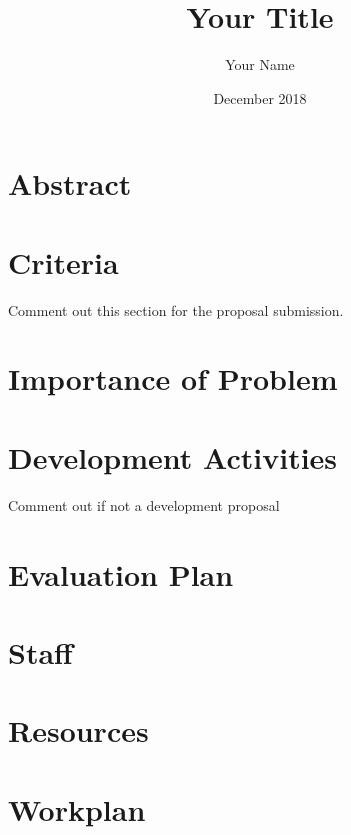 \documentclass[12pt,letterpaper]{article}
\title{Your Title}
\author{Your Name}
\date{December 2018}
\begin{document}
\maketitle
\thispagestyle{empty}

\tableofcontents
\clearpage
\section*{Abstract}
{

\normalsize

}

\clearpage
{} 

%
\section{Criteria}
Comment out this section for the proposal submission.

\section{Importance of Problem}

\section{Development Activities}
Comment out if not a development proposal

%
\section{Evaluation Plan}

\section{Staff}

\section{Resources}

\section{Workplan}

\end{document}

